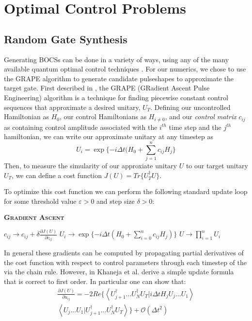 \documentclass[aps,nofootinbib,pra,notitlepage,twocolumn]{revtex4-1}
\newcommand{\braket}[2]{\left\langle #1 | #2 \right\rangle}
\begin{document}
\section{Optimal Control Problems}\label{ocp}
\subsection{Random Gate Synthesis}
Generating BOCSs can be done in a variety of ways, using any  of the many available quantum optimal control techniques \cite{Khaneja2005, Caneva2011, Machnes2018}. For our numerics, we chose to use the GRAPE algorithm to generate candidate pulseshapes to approximate the target gate. First described in \cite{Khaneja2005}, the GRAPE (GRadient Ascent Pulse Engineering) algorithm is a technique for finding piecewise constant control sequences that approximate a desired unitary, $U_T$. Defining our uncontrolled Hamiltonian as $H_0$, our control Hamiltonians as $H_{i\neq 0}$, and our \textit{control matrix} $c_{ij}$ as containing control amplitude associated with the $i^{th}$ time step and the $j^{th}$ hamiltonian, we can write our approximate unitary at any timestep as
\begin{equation}\label{eq:3}
  U_i = \exp\{-i\Delta t(H_0 + \sum_{j=1}^{n}c_{ij}H_{j}\}
\end{equation}
Then, to measure the simularity of our approxiate unitary $U$ to our target unitary $U_T$, we can define a cost function $J(U) = Tr\{U_T^{\dagger}U\}$.

To optimize this cost function we can perform the following standard update loop for some threshold value $\varepsilon > 0$ and step size $\delta > 0$:
\begin{algorithm}[H]
  \caption{\textsc{\textbf{Gradient Ascent}}}
  \begin{algorithmic}
    \State $c_{ij} \rightarrow c_{ij} + \delta\frac{\partial J(U)}{\partial c_{ij}}$
    \State $U_i \rightarrow \exp\{-i\Delta t(H_0 + \sum_{i=0}^{n}c_{ij}H_j)\}$
    \EndFor
    \State $U \rightarrow \prod_{i=1}^nU_i$
    \EndWhile
  \end{algorithmic}
\end{algorithm}

In general these gradients can be computed by propagating partial derivatives of the cost function with respect to control parameters through each timestep of the  via the chain rule. However, in \cite{Khaneja2005} Khaneja et al. derive a simple update formula that is correct to first order. In particular one can show that:
\begin{equation}\label{eq:update}
  \begin{split}
\frac{\partial J(U)}{\partial u_{ij}} = -2Re\{\braket{{U_{j+1}^{\dagger}...U_N^{\dagger} U_T}}{i\Delta tH_jU_j...U_1}\\
\braket{U_j...U_1}{U_{j+1}^{\dagger}...U_N^{\dagger} U_T}\} +  \mathcal{O}(\Delta t^2)
  \end{split}
\end{equation}
\end{document}
